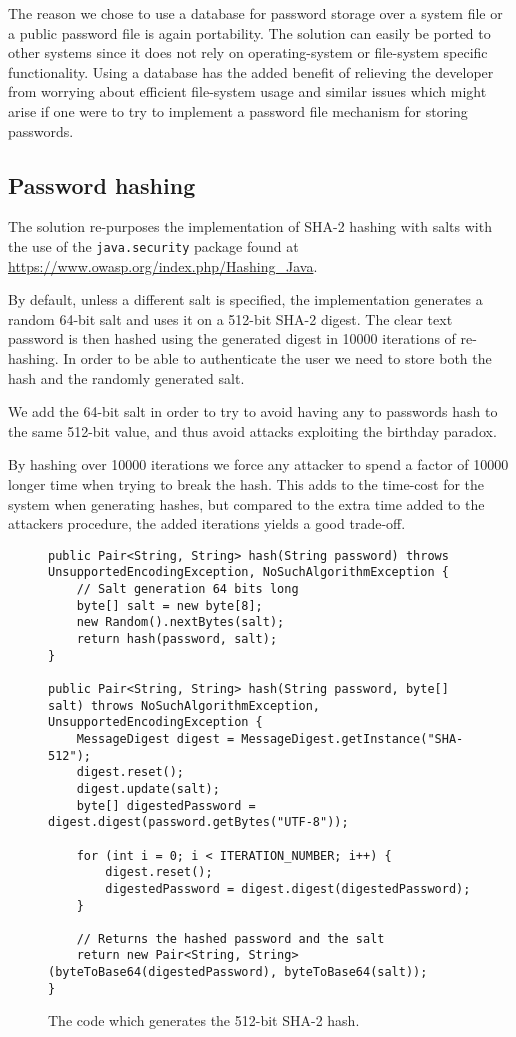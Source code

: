 \documentclass[12pt]{article}
\begin{document}
The reason we chose to use a database for password storage over a system file or a public password file is again portability. The solution can easily be ported to other systems since it does not rely on operating-system or file-system specific functionality. Using a database has the added benefit of relieving the developer from worrying about efficient file-system usage and similar issues which might arise if one were to try to implement a password file mechanism for storing passwords.

\subsection{Password hashing}
\label{sub:Password hashing}

The solution re-purposes the implementation of SHA-2 hashing with salts with the use of the \texttt{java.security} package found at \url{https://www.owasp.org/index.php/Hashing_Java}.

By default, unless a different salt is specified, the implementation generates a random 64-bit salt and uses it on a 512-bit SHA-2 digest. The clear text password is then hashed using the generated digest in 10000 iterations of re-hashing.
In order to be able to authenticate the user we need to store both the hash and the randomly generated salt.

We add the 64-bit salt in order to try to avoid having any to passwords hash to the same 512-bit value, and thus avoid attacks exploiting the birthday paradox.

By hashing over 10000 iterations we force any attacker to spend a factor of 10000 longer time when trying to break the hash. This adds to the time-cost for the system when generating hashes, but compared to the extra time added to the attackers procedure, the added iterations yields a good trade-off.

\begin{figure}[h!]
    \begin{lstlisting}
public Pair<String, String> hash(String password) throws UnsupportedEncodingException, NoSuchAlgorithmException {
    // Salt generation 64 bits long
    byte[] salt = new byte[8];
    new Random().nextBytes(salt);
    return hash(password, salt);
}

public Pair<String, String> hash(String password, byte[] salt) throws NoSuchAlgorithmException, UnsupportedEncodingException {
    MessageDigest digest = MessageDigest.getInstance("SHA-512");
    digest.reset();
    digest.update(salt);
    byte[] digestedPassword = digest.digest(password.getBytes("UTF-8"));

    for (int i = 0; i < ITERATION_NUMBER; i++) {
        digest.reset();
        digestedPassword = digest.digest(digestedPassword);
    }

    // Returns the hashed password and the salt
    return new Pair<String, String>(byteToBase64(digestedPassword), byteToBase64(salt));
}
    \end{lstlisting}
    \caption{The code which generates the 512-bit SHA-2 hash.}
\end{figure}
\end{document}
